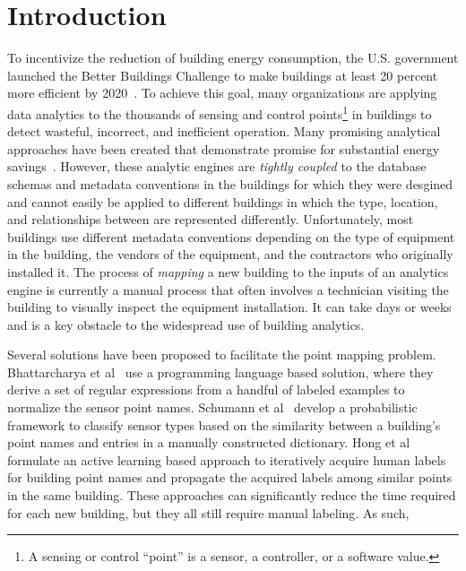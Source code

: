 \section{Introduction}

To incentivize the reduction of building energy consumption, the U.S. government
launched the Better Buildings Challenge to make buildings at least 20 percent
more efficient by 2020~\cite{doe2013better}. To achieve this goal, many
organizations are applying data analytics to the thousands of sensing and
control points\footnote{A sensing or control ``point'' is a sensor, a
  controller, or a software value.} in buildings to detect wasteful, incorrect,
and inefficient operation.  Many promising analytical approaches have been
created that demonstrate promise for substantial energy savings~\cite{find}.
However, these analytic engines are \emph{tightly coupled} to the database
schemas and metadata conventions in the buildings for which they were desgined
and cannot easily be applied to different buildings in which the type, location,
and relationships between are represented differently. Unfortunately, most
buildings use different metadata conventions depending on the type of equipment
in the building, the vendors of the equipment, and the contractors who
originally installed it. The process of {\em mapping} a new building to the
inputs of an analytics engine is currently a manual process that often involves
a technician visiting the building to visually inspect the equipment
installation. It can take days or weeks and is a key obstacle to the widespread
use of building analytics.

Several solutions have been proposed to facilitate the point mapping problem.
Bhattarcharya et al~\cite{arka} use a programming language based solution,
where they derive a set of regular expressions from a handful of labeled examples
to normalize the sensor point names.
Schumann et al~\cite{ibm} develop a probabilistic framework to classify sensor types
based on the similarity between a building's point names and entries in a manually constructed dictionary.
Hong et al~\cite{cikm} formulate an active learning based approach to
iteratively acquire human labels for building point names and propagate the
acquired labels among similar points in the same building.  These approaches can
significantly reduce the time required for each new building, but they all still
require manual labeling. As such, 

